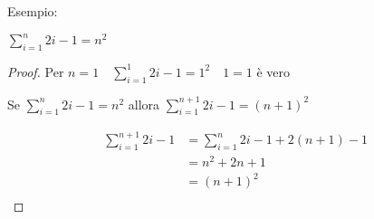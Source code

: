 Esempio:\newline
\begin{thm}
 $\displaystyle \sum_{i = 1}^n 2i-1 = n^2$
\end{thm}

\begin{proof}
Per $n = 1 \quad \displaystyle \sum_{i = 1}^1 2i-1 = 1^2 \quad 1 = 1$ è vero

Se $\displaystyle \sum_{i = 1}^n 2i-1 = n^2$ allora
$\displaystyle \sum_{i = 1}^{n+1} 2i-1 = (n+1)^2$

\begin{equation*}
\begin{split}
  \sum_{i=1}^{n+1} 2i-1 & = \sum_{i=1}^n 2i-1 + 2(n+1) - 1 \\
         & = n^2 + 2n + 1 \\
         & = (n+1)^2 \\
\end{split}
\end{equation*}
\end{proof}
